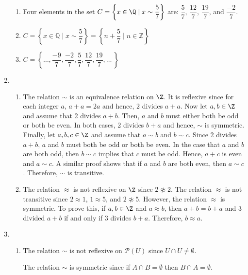 \begin{enumerate}
\begin{enumerate}
\item Four elements in the set $C = \left\{ { {x \in \Q } \mid x \sim \dfrac{5}{7} } \right\}$ are:  $\dfrac{5}{7}$, $\dfrac{12}{7}$, $\dfrac{19}{7}$, and $\dfrac{-2}{7}$.

\item $C = \left\{ x \in \mathbb{Q}  \mid x \sim \dfrac{5}{7} \right\} = 
\left\{ n + \dfrac{5}{7} \mid n \in \mathbb{Z} \right\}$

\item $C = \left\{ \ldots, \dfrac{-9}{7}, \dfrac{-2}{7}, \dfrac{5}{7}, \dfrac{12}{7}, \dfrac{19}{7}, \ldots \, \right\}$
\end{enumerate}



\item \begin{enumerate}
\item The relation $\sim$ is an equivalence relation on $\Z$.  It is reflexive since for each integer $a$, $a + a = 2a$ and hence, $2$ divides $a + a$.  Now let $a, b \in \Z$ and assume that 2 divides $a + b$.  Then, $a$ and $b$ must either both be odd or both be even.  In both cases, 2 divides $b + a$ and hence, $\sim$ is symmetric.  Finally, let $a, b, c \in \Z$ and assume that 
$a \sim b$ and $b \sim c$.  Since 2 divides $a + b$, $a$ and $b$ must both be odd or both be even.  In the case that $a$ and $b$ are both odd, then $b \sim c$ implies that $c$ must be odd.  Hence, $a + c$ is even and $a \sim c$.  A similar proof shows that if $a$ and $b$ are both even, then $a \sim c$.  Therefore, $\sim$ is transitive.

\item The relation $\approx$ is not reflexive on $\Z$ since $2 \not\approx 2$.  The relation $\approx$ is not transitive since $2 \approx 1$, $1 \approx 5$, and $2 \not\approx 5$.  However, the relation $\approx$ is symmetric.  To prove this, if $a, b \in \Z$ and $a \approx b$, then 
$a + b = b + a$ and 3 divided $a + b$ if and only if 3 divides $b + a$.  Therefore, $b \approx a$.
\end{enumerate}



\item \begin{enumerate}
\item The relation  $\sim$ is not reflexive on  $\mathcal{P}\left( U \right)$  since  $U \cap U \ne \emptyset $.

The relation  $\sim$ is symmetric since  if  $A \cap B = \emptyset $ then  
$B \cap A = \emptyset $.


\end{enumerate}
\end{enumerate}
